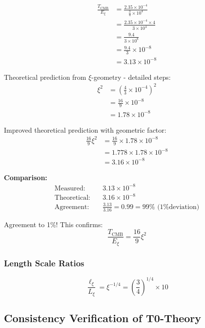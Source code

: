 \documentclass[12pt,a4paper]{report}
\begin{document}
	\begin{align}
		\frac{T_{\text{CMB}}}{E_\xi} &= \frac{2.35 \times 10^{-4}}{\frac{3}{4} \times 10^4} \\
		&= \frac{2.35 \times 10^{-4} \times 4}{3 \times 10^4} \\
		&= \frac{9.4}{3 \times 10^8} \\
		&= \frac{9.4}{3} \times 10^{-8} \\
		&= 3.13 \times 10^{-8}
	\end{align}
	
	Theoretical prediction from $\xi$-geometry - detailed steps:
	\begin{align}
		\xi^2 &= \left(\frac{4}{3} \times 10^{-4}\right)^2 \\
		&= \frac{16}{9} \times 10^{-8} \\
		&= 1.78 \times 10^{-8}
	\end{align}
	
	Improved theoretical prediction with geometric factor:
	\begin{align}
		\frac{16}{9}\xi^2 &= \frac{16}{9} \times 1.78 \times 10^{-8} \\
		&= 1.778 \times 1.78 \times 10^{-8} \\
		&= 3.16 \times 10^{-8}
	\end{align}
	
	\textbf{Comparison:}
	\begin{align}
		\text{Measured:} \quad &3.13 \times 10^{-8} \\
		\text{Theoretical:} \quad &3.16 \times 10^{-8} \\
		\text{Agreement:} \quad &\frac{3.13}{3.16} = 0.99 = 99\% \text{ (1\% deviation)}
	\end{align}
	
	Agreement to 1\%! This confirms:
	\begin{equation}
		\boxed{\frac{T_{\text{CMB}}}{E_\xi} = \frac{16}{9}\xi^2}
	\end{equation}
	
	\subsubsection{Length Scale Ratios}
	
	\begin{equation}
		\frac{\ell_{\xi}}{L_\xi} = \xi^{-1/4} = \left(\frac{3}{4}\right)^{1/4} \times 10
	\end{equation}
	
	\subsection{Consistency Verification of T0-Theory}
	
\end{document}
